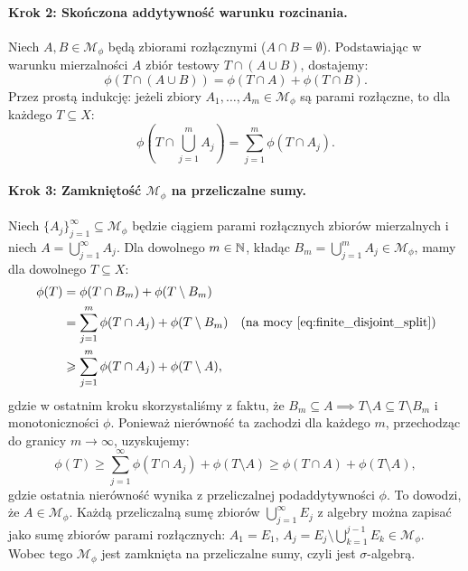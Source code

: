 \begin{dow}
    \paragraph{Krok 2: Skończona addytywność warunku rozcinania.}
    Niech $A, B \in \mathcal{M}_\phi$ będą zbiorami rozłącznymi ($A \cap B = \emptyset$). Podstawiając w warunku mierzalności $A$ zbiór testowy $T \cap (A \cup B)$, dostajemy:
    \begin{equation}\label{eq:disjoint_split}
        \phi(T \cap (A \cup B)) = \phi(T \cap A) + \phi(T \cap B).
    \end{equation}
    Przez prostą indukcję: jeżeli zbiory $A_1, \dots, A_m \in \mathcal{M}_\phi$ są parami rozłączne, to dla każdego $T \subseteq X$:
    \begin{equation}\label{eq:finite_disjoint_split}
        \phi\left(T \cap \bigcup_{j=1}^m A_j\right) = \sum_{j=1}^m \phi(T \cap A_j).
    \end{equation}

    \paragraph{Krok 3: Zamkniętość $\mathcal{M}_\phi$ na przeliczalne sumy.}
    Niech $\{A_j\}_{j=1}^\infty \subseteq \mathcal{M}_\phi$ będzie ciągiem parami rozłącznych zbiorów mierzalnych i niech $A = \bigcup_{j=1}^\infty A_j$. Dla dowolnego $m \in \mathbb{N}$, kładąc $B_m = \bigcup_{j=1}^m A_j \in \mathcal{M}_\phi$, mamy dla dowolnego $T \subseteq X$:
    \begin{align}
        \phi(T) & = \phi(T \cap B_m) + \phi(T \setminus B_m)                                                                      \\
                & = \sum_{j=1}^m \phi(T \cap A_j) + \phi(T \setminus B_m) \quad \text{(na mocy \eqref{eq:finite_disjoint_split})} \\
                & \geqslant \sum_{j=1}^m \phi(T \cap A_j) + \phi(T \setminus A),
    \end{align}
    gdzie w ostatnim kroku skorzystaliśmy z faktu, że $B_m \subseteq A \implies T \setminus A \subseteq T \setminus B_m$ i monotoniczności $\phi$.
    Ponieważ nierówność ta zachodzi dla każdego $m$, przechodząc do granicy $m \to \infty$, uzyskujemy:
    \begin{equation*}
        \phi(T) \ge \sum_{j=1}^\infty \phi(T \cap A_j) + \phi(T \setminus A) \ge \phi(T \cap A) + \phi(T \setminus A),
    \end{equation*}
    gdzie ostatnia nierówność wynika z przeliczalnej podaddytywności $\phi$. To dowodzi, że $A \in \mathcal{M}_\phi$. Każdą przeliczalną sumę zbiorów $\bigcup_{j=1}^\infty E_j$ z algebry można zapisać jako sumę zbiorów parami rozłącznych: $A_1 = E_1$, $A_j = E_j \setminus \bigcup_{k=1}^{j-1} E_k \in \mathcal{M}_\phi$.
    Wobec tego $\mathcal{M}_\phi$ jest zamknięta na przeliczalne sumy, czyli jest $\sigma$-algebrą.


\end{dow}
